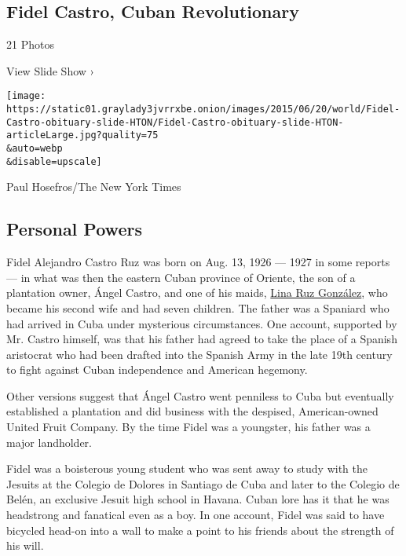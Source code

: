\href{https://www.nytimes3xbfgragh.onion/slideshow/2016/11/26/world/americas/fidel-castro-cuban-revolutionary.html}{}

\hypertarget{fidel-castro-cuban-revolutionary}{%
\subsection{Fidel Castro, Cuban
Revolutionary}\label{fidel-castro-cuban-revolutionary}}

21 Photos

View Slide Show ›

\texttt{[image: https://static01.graylady3jvrrxbe.onion/images/2015/06/20/world/Fidel-Castro-obituary-slide-HTON/Fidel-Castro-obituary-slide-HTON-articleLarge.jpg?quality=75\\\&auto=webp\\\&disable=upscale]}

Paul Hosefros/The New York Times

\hypertarget{personal-powers}{%
\subsection{Personal Powers}\label{personal-powers}}

Fidel Alejandro Castro Ruz was born on Aug. 13, 1926 --- 1927 in some
reports --- in what was then the eastern Cuban province of Oriente, the
son of a plantation owner, Ángel Castro, and one of his maids,
\href{http://timesmachine.nytimes3xbfgragh.onion/timesmachine/1963/08/08/81821103.html?pageNumber=NaN\&zoom=16}{Lina
Ruz González}, who became his second wife and had seven children. The
father was a Spaniard who had arrived in Cuba under mysterious
circumstances. One account, supported by Mr. Castro himself, was that
his father had agreed to take the place of a Spanish aristocrat who had
been drafted into the Spanish Army in the late 19th century to fight
against Cuban independence and American hegemony.

Other versions suggest that Ángel Castro went penniless to Cuba but
eventually established a plantation and did business with the despised,
American-owned United Fruit Company. By the time Fidel was a youngster,
his father was a major landholder.

Fidel was a boisterous young student who was sent away to study with the
Jesuits at the Colegio de Dolores in Santiago de Cuba and later to the
Colegio de Belén, an exclusive Jesuit high school in Havana. Cuban lore
has it that he was headstrong and fanatical even as a boy. In one
account, Fidel was said to have bicycled head-on into a wall to make a
point to his friends about the strength of his will.

